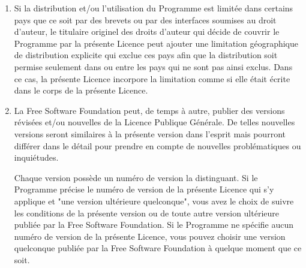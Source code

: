 {\begin{enumerate}
Si une partie quelconque de cet article est tenue pour nulle ou inopposable dans une circonstance particulière quelconque, l'intention est que le reste de l'article s'applique. La totalité de la section s'appliquera dans toutes les autres circonstances.

Cet article n'a pas pour but de vous induire à transgresser un quelconque brevet ou d'autres revendications à un droit de propriété ou à contester la validité de la moindre de ces revendications ; cet article a pour seul objectif de protéger l'intégrité du système de distribution du logiciel libre, qui est mis en oeuvre par la pratique des licenses publiques. De nombreuses personnes ont fait de généreuses contributions au large spectre de logiciels distribués par ce système en se fiant à l'application cohérente de ce système ; il appartient à chaque auteur/donateur de décider si il ou elle veut distribuer du logiciel par l'intermédiaire d'un quelconque autre système et un concessionaire ne peut imposer ce choix.

Cet article a pour but de rendre totalement limpide ce que l'on pense être une conséquence du reste de la présente Licence.

\item  Si la distribution et/ou l'utilisation du Programme est limitée dans certains pays que ce soit par des brevets ou par des interfaces soumises au droit d'auteur, le titulaire originel des droits d'auteur qui décide de couvrir le Programme par la présente Licence peut ajouter une limitation géographique de distribution explicite qui exclue ces pays afin que la distribution soit permise seulement dans ou entre les pays qui ne sont pas ainsi exclus. Dans ce cas, la présente Licence incorpore la limitation comme si elle était écrite dans le corps de la présente Licence.

\item  La Free Software Foundation peut, de temps à autre, publier des versions révisées et/ou nouvelles de la Licence Publique Générale. De telles nouvelles versions seront similaires à la présente version dans l'esprit mais pourront différer dans le détail pour prendre en compte de nouvelles problématiques ou inquiétudes.

Chaque version possède un numéro de version la distinguant. Si le Programme précise le numéro de version de la présente Licence qui s'y applique et "une version ultérieure quelconque", vous avez le choix de suivre les conditions de la présente version ou de toute autre version ultérieure publiée par la Free Software Foundation. Si le Programme ne spécifie aucun numéro de version de la présente Licence, vous pouvez choisir une version quelconque publiée par la Free Software Foundation à quelque moment que ce soit.


\end{enumerate}}
